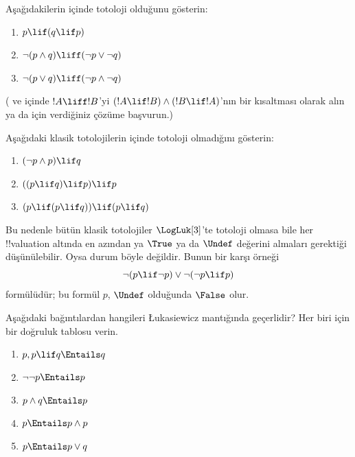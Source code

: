 \begin{prob}
  Aşağıdakilerin \LogLuk[3] içinde totoloji olduğunu gösterin:
  \begin{enumerate}
    \item $p \lif (q \lif p)$
    \item\label{mvl:thr:luk:prob:luk-taut-2} $\lnot(p \land q) \liff (\lnot p \lor \lnot q)$
    \item\label{mvl:thr:luk:prob:luk-taut-3} $\lnot(p \lor q) \liff (\lnot p \land \lnot q)$
  \end{enumerate}
  ( ve
   içinde $!A \liff !B$'yi
  $(!A \lif !B) \land (!B \lif !A)$'nın bir kısaltması olarak alın ya da
   için verdiğiniz çözüme başvurun.)
\end{prob}

\begin{prob}
  Aşağıdaki klasik totolojilerin \LogLuk[3] içinde totoloji olmadığını
  gösterin:
  \begin{enumerate}
    \item $(\lnot p \land p) \lif q$
    \item $((p \lif q) \lif p) \lif p$
    \item $(p \lif (p \lif q)) \lif (p \lif q)$
  \end{enumerate}
\end{prob}

Bu nedenle bütün klasik totolojiler $\LogLuk[3]$'te totoloji olmasa bile her
!!{valuation} altında en azından ya $\True$ ya da $\Undef$ değerini almaları
gerektiği düşünülebilir. Oysa durum böyle değildir. Bunun bir karşı örneği
\[
  \lnot(p \lif \lnot p) \lor \lnot(\lnot p \lif p)
\]
formülüdür; bu formül $p$, $\Undef$ olduğunda $\False$ olur.

\begin{prob}
  Aşağıdaki bağıntılardan hangileri \L ukasiewicz mantığında geçerlidir? Her
  biri için bir doğruluk tablosu verin.
  \begin{enumerate}
    \item $p, p \lif q \Entails q$
    \item $\lnot\lnot p \Entails p$
    \item $p \land q \Entails p$
    \item $p \Entails p \land p$
    \item $p \Entails p \lor q$
  \end{enumerate}
\end{prob}

